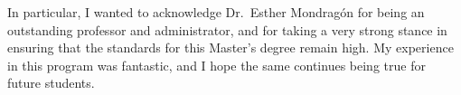 \documentclass[a4paper,11pt]{article}
\begin{document}
In particular, I wanted to acknowledge Dr.\ Esther Mondragón for being an outstanding professor and administrator, and for taking a very strong stance in ensuring that the standards for this Master's degree remain high.
My experience in this program was fantastic, and I hope the same continues being true for future students.

\clearpage{}


\clearpage{}
\tableofcontents{}

\clearpage{}


\clearpage{}


\clearpage{}


% 

\clearpage{}


% 

\clearpage{}


\clearpage{}


\clearpage{}
\begin{small}
	
\end{small}


\clearpage{}


\clearpage{}
\appendixpage{}
\appendix{}



\clearpage{}


\clearpage{}

\end{document}
